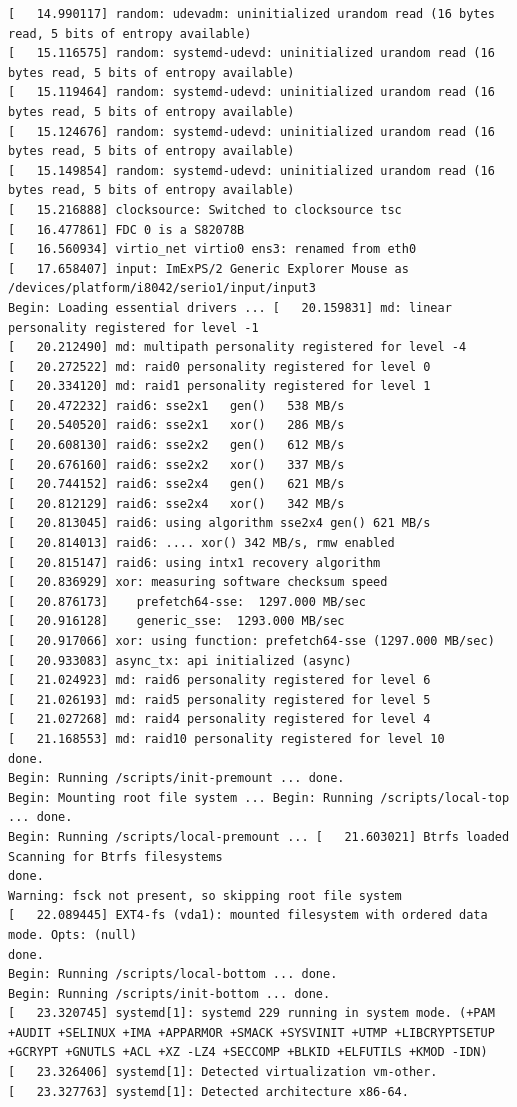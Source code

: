 \documentclass[12pt]{article}
\begin{document}
\begin{verbatim}
[   14.990117] random: udevadm: uninitialized urandom read (16 bytes read, 5 bits of entropy available)
[   15.116575] random: systemd-udevd: uninitialized urandom read (16 bytes read, 5 bits of entropy available)
[   15.119464] random: systemd-udevd: uninitialized urandom read (16 bytes read, 5 bits of entropy available)
[   15.124676] random: systemd-udevd: uninitialized urandom read (16 bytes read, 5 bits of entropy available)
[   15.149854] random: systemd-udevd: uninitialized urandom read (16 bytes read, 5 bits of entropy available)
[   15.216888] clocksource: Switched to clocksource tsc
[   16.477861] FDC 0 is a S82078B
[   16.560934] virtio_net virtio0 ens3: renamed from eth0
[   17.658407] input: ImExPS/2 Generic Explorer Mouse as /devices/platform/i8042/serio1/input/input3
Begin: Loading essential drivers ... [   20.159831] md: linear personality registered for level -1
[   20.212490] md: multipath personality registered for level -4
[   20.272522] md: raid0 personality registered for level 0
[   20.334120] md: raid1 personality registered for level 1
[   20.472232] raid6: sse2x1   gen()   538 MB/s
[   20.540520] raid6: sse2x1   xor()   286 MB/s
[   20.608130] raid6: sse2x2   gen()   612 MB/s
[   20.676160] raid6: sse2x2   xor()   337 MB/s
[   20.744152] raid6: sse2x4   gen()   621 MB/s
[   20.812129] raid6: sse2x4   xor()   342 MB/s
[   20.813045] raid6: using algorithm sse2x4 gen() 621 MB/s
[   20.814013] raid6: .... xor() 342 MB/s, rmw enabled
[   20.815147] raid6: using intx1 recovery algorithm
[   20.836929] xor: measuring software checksum speed
[   20.876173]    prefetch64-sse:  1297.000 MB/sec
[   20.916128]    generic_sse:  1293.000 MB/sec
[   20.917066] xor: using function: prefetch64-sse (1297.000 MB/sec)
[   20.933083] async_tx: api initialized (async)
[   21.024923] md: raid6 personality registered for level 6
[   21.026193] md: raid5 personality registered for level 5
[   21.027268] md: raid4 personality registered for level 4
[   21.168553] md: raid10 personality registered for level 10
done.
Begin: Running /scripts/init-premount ... done.
Begin: Mounting root file system ... Begin: Running /scripts/local-top ... done.
Begin: Running /scripts/local-premount ... [   21.603021] Btrfs loaded
Scanning for Btrfs filesystems
done.
Warning: fsck not present, so skipping root file system
[   22.089445] EXT4-fs (vda1): mounted filesystem with ordered data mode. Opts: (null)
done.
Begin: Running /scripts/local-bottom ... done.
Begin: Running /scripts/init-bottom ... done.
[   23.320745] systemd[1]: systemd 229 running in system mode. (+PAM +AUDIT +SELINUX +IMA +APPARMOR +SMACK +SYSVINIT +UTMP +LIBCRYPTSETUP +GCRYPT +GNUTLS +ACL +XZ -LZ4 +SECCOMP +BLKID +ELFUTILS +KMOD -IDN)
[   23.326406] systemd[1]: Detected virtualization vm-other.
[   23.327763] systemd[1]: Detected architecture x86-64.


\end{verbatim}
\end{document}
